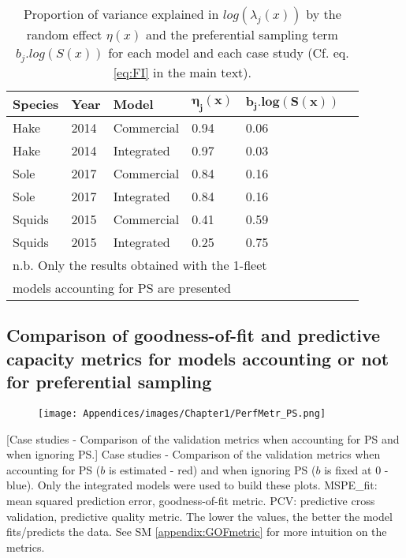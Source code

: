 \begin{center}
\begin{longtable}{llllll}
\caption{Proportion of variance explained in \(log(\lambda_j(x))\) by the random effect  \(\eta(x)\) and the preferential sampling term \(b_j.log(S(x))\) for each model and each case study (Cf. eq. \ref{eq:FI} in the main text).}\label{tab:ProprVarSP} \\

\textbf{Species} & \textbf{Year} & \textbf{Model}      &  \(\mathbf{\eta_j(x)}\)  & \(\mathbf{b_j.log(S(x))}\)  &  \\
\hline
Hake   & 2014 & Commercial & 0.94 & 0.06 &  \\
Hake    & 2014 & Integrated & 0.97 & 0.03 &  \\
Sole    & 2017 & Commercial & 0.84 & 0.16 &  \\
Sole    & 2017 & Integrated & 0.84 & 0.16 &  \\
Squids  & 2015 & Commercial & 0.41 & 0.59 &  \\
Squids  & 2015 & Integrated & 0.25 & 0.75 &  \\
\multicolumn{6}{l}{n.b. Only the results obtained with the 1-fleet} \\
\multicolumn{6}{l}{models accounting for PS are presented} \\
\end{longtable}
\end{center}

\newpage

\subsection{Comparison of goodness-of-fit and predictive capacity metrics for models accounting or not for preferential sampling}\label{appendix:PerfMetr_PS}

\begin{figure}[H]
   \begin{center}
      \texttt{[image: Appendices/images/Chapter1/PerfMetr\_PS.png]}
   \end{center}
   \label{fig:PerfMetr_PS}
\end{figure}

[Case studies - Comparison of the validation metrics when accounting for PS and when ignoring PS.]
   {Case studies - Comparison of the validation metrics when accounting for PS ($b$ is estimated - red) and when ignoring PS ($b$ is fixed at 0 - blue). Only the integrated models were used to build these plots. MSPE_fit: mean squared prediction error, goodness-of-fit metric. PCV: predictive cross validation, predictive quality metric. The lower the values, the better the model fits/predicts the data. See SM \ref{appendix:GOFmetric} for more intuition on the metrics.}
   

